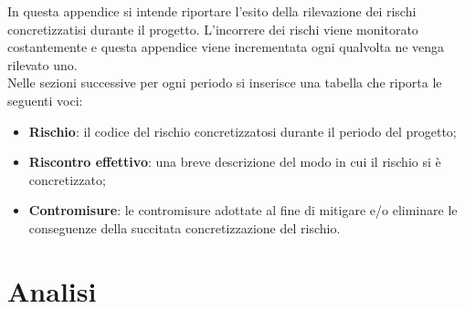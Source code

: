 \documentclass[./PianodiProgetto.tex]{subfiles}
\begin{document}
In questa appendice si intende riportare l'esito della rilevazione dei rischi concretizzatisi durante il progetto. L'incorrere dei rischi viene monitorato costantemente e questa appendice viene incrementata ogni qualvolta ne venga rilevato uno. \\
Nelle sezioni successive per ogni periodo si inserisce una tabella che riporta le seguenti voci:

\begin{itemize}
	\item \textbf{Rischio}: il codice del rischio concretizzatosi durante il periodo del progetto;
	\item \textbf{Riscontro effettivo}: una breve descrizione del modo in cui il rischio si è concretizzato;
	\item \textbf{Contromisure}: le contromisure adottate al fine di mitigare e/o eliminare le conseguenze della succitata concretizzazione del rischio.
\end{itemize}

\section{Analisi}

\setlength\LTleft{-5.5mm}
\end{document}
